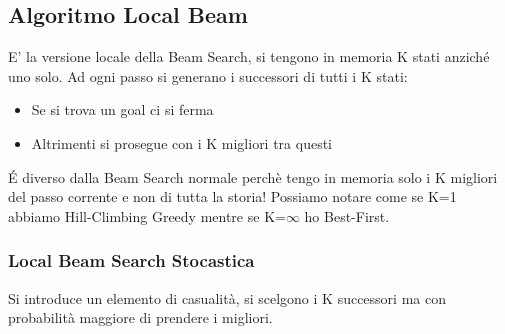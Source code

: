 \documentclass{article}
\begin{document}
\subsection{Algoritmo Local Beam}
E' la versione locale della Beam Search, si tengono in memoria K stati anziché uno solo. Ad ogni passo si generano i successori di tutti i K stati:
\begin{itemize}
    \item Se si trova un goal ci si ferma
    \item Altrimenti si prosegue con i K migliori tra questi
\end{itemize}
É diverso dalla Beam Search normale perchè tengo in memoria solo i K migliori del passo corrente e non di tutta la storia! Possiamo notare come se K=1 abbiamo Hill-Climbing Greedy mentre se K=$\infty$ ho Best-First.

\subsubsection{Local Beam Search Stocastica}
Si introduce un elemento di casualità, si scelgono i K successori ma con probabilità maggiore di prendere i migliori.
\end{document}
